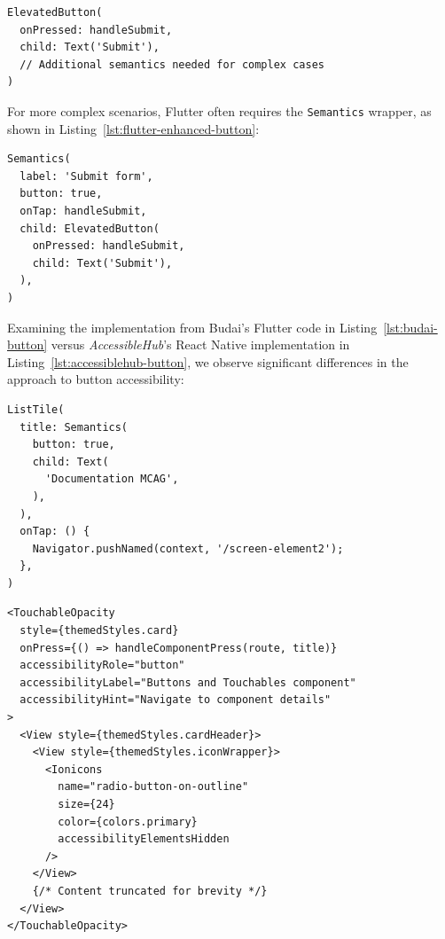 \begin{lstlisting}[style=DartStyle, caption=Accessible button in Flutter, label=lst:flutter-button]
ElevatedButton(
  onPressed: handleSubmit,
  child: Text('Submit'),
  // Additional semantics needed for complex cases
)
\end{lstlisting}

For more complex scenarios, Flutter often requires the \texttt{Semantics} wrapper, as shown in Listing~\ref{lst:flutter-enhanced-button}:

\begin{lstlisting}[style=DartStyle, caption=Enhanced button accessibility in Flutter, label=lst:flutter-enhanced-button]
Semantics(
  label: 'Submit form',
  button: true,
  onTap: handleSubmit,
  child: ElevatedButton(
    onPressed: handleSubmit,
    child: Text('Submit'),
  ),
)
\end{lstlisting}

\pagebreak

Examining the implementation from Budai's Flutter code in Listing~\ref{lst:budai-button} versus \textit{AccessibleHub}'s React Native implementation in Listing~\ref{lst:accessiblehub-button}, we observe significant differences in the approach to button accessibility:

\begin{lstlisting}[style=DartStyle, caption=Budai's Flutter implementation of accessible buttons, label=lst:budai-button]
ListTile(
  title: Semantics(
    button: true,
    child: Text(
      'Documentation MCAG',
    ),
  ),
  onTap: () {
    Navigator.pushNamed(context, '/screen-element2');
  },
)
\end{lstlisting}

\begin{lstlisting}[style=ReactNativeStyle, caption=\textit{AccessibleHub}'s React Native implementation of accessible buttons, label=lst:accessiblehub-button]
<TouchableOpacity
  style={themedStyles.card}
  onPress={() => handleComponentPress(route, title)}
  accessibilityRole="button"
  accessibilityLabel="Buttons and Touchables component"
  accessibilityHint="Navigate to component details"
>
  <View style={themedStyles.cardHeader}>
    <View style={themedStyles.iconWrapper}>
      <Ionicons
        name="radio-button-on-outline"
        size={24}
        color={colors.primary}
        accessibilityElementsHidden
      />
    </View>
    {/* Content truncated for brevity */}
  </View>
</TouchableOpacity>
\end{lstlisting}

